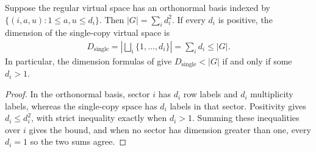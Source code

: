\begin{lemma}%
    \label{thm:peps_fourier_bond_dimensions}
    \leanok
    Suppose the regular virtual space has an orthonormal basis indexed by
    $\{(i,a,u):1\le a,u\le d_i\}$. Then
    $|G|=\sum_i d_i^2$. If every $d_i$ is positive, the dimension of
    the single-copy virtual space is
    \begin{align}
        D_{\mathrm{single}}=\left|\bigsqcup_i\{1,\ldots,d_i\}\right|
        =\sum_i d_i\le |G|.
        \label{eq:peps_single_copy_bond_dimension}
    \end{align}
    In particular, the dimension formulas of
    \cite[Section~7]{Schuch2010PEPS} give $D_{\mathrm{single}}<|G|$ if and
    only if some $d_i>1$.
\end{lemma}
\begin{proof}\leanok
    In the orthonormal basis, sector $i$ has $d_i$ row labels and
    $d_i$ multiplicity labels, whereas the single-copy space has $d_i$ labels
    in that sector. Positivity gives $d_i\le d_i^2$, with strict
    inequality exactly when $d_i>1$. Summing these inequalities over $i$
    gives the bound, and when no sector has dimension greater than one,
    every $d_i=1$ so the two sums agree.
\end{proof}

